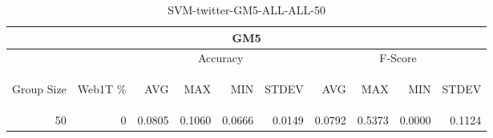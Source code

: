 \begin{center}
\begin{table}[htbp] 
 \begin{center}
\begin{tabular}{ | r | r | r | r | r | r | r | r | r | r |}
\hline
\multicolumn{10}{|c|}{GM5}\\
\hline
 & & \multicolumn{4}{|c|}{Accuracy} & \multicolumn{4}{|c|}{F-Score}\\ \cline{3-10}
\begin{sideways}Group Size\end{sideways} & \begin{sideways}Web1T \%\end{sideways} & \begin{sideways}AVG\end{sideways} & \begin{sideways}MAX\end{sideways} & \begin{sideways}MIN\end{sideways} & \begin{sideways}STDEV\end{sideways} & \begin{sideways}AVG\end{sideways} & \begin{sideways}MAX\end{sideways} & \begin{sideways}MIN\end{sideways} & \begin{sideways}STDEV\end{sideways}\\
\hline
\multirow{0}{*}{50}
 & 0 & 0.0805 & 0.1060 & 0.0666 & 0.0149 & 0.0792 & 0.5373 & 0.0000 & 0.1124\\ \cline{2-10}
\hline
\end{tabular}
\caption{SVM-twitter-GM5-ALL-ALL-50}
\label{table:SVM-twitter-GM5-ALL-ALL-50}
\end{center}
 \end{table}
\end{center}

